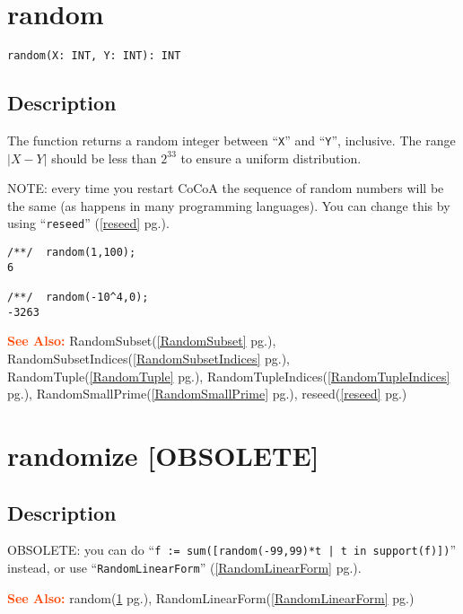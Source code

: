 \documentclass[a4paper]{mybook}
\newenvironment{command}{}{} %
\newcommand\SeeAlso{\par\textcolor{OrangeRed}{\textbf{\large See Also: }}}
\begin{document}
\section{random}
\label{random}
\begin{command} %


\begin{Verbatim}[label=syntax, rulecolor=\color{MidnightBlue},
frame=single]
random(X: INT, Y: INT): INT
\end{Verbatim}


\subsection*{Description}

The function returns a random integer between ``\verb&X&'' and ``\verb&Y&'', inclusive.  The range
$|X-Y|$ should be less than $2^33$ to ensure a uniform distribution.
\par 
NOTE: every time you restart CoCoA the sequence of random numbers will
be the same (as happens in many programming languages).  You can change
this by using ``\verb&reseed&'' (\ref{reseed} pg.\pageref{reseed}).
\begin{Verbatim}[label=example, rulecolor=\color{PineGreen}, frame=single]
/**/  random(1,100);
6

/**/  random(-10^4,0);
-3263
\end{Verbatim}


\SeeAlso %
  RandomSubset(\ref{RandomSubset} pg.\pageref{RandomSubset}), 
    RandomSubsetIndices(\ref{RandomSubsetIndices} pg.\pageref{RandomSubsetIndices}), 
    RandomTuple(\ref{RandomTuple} pg.\pageref{RandomTuple}), 
    RandomTupleIndices(\ref{RandomTupleIndices} pg.\pageref{RandomTupleIndices}), 
    RandomSmallPrime(\ref{RandomSmallPrime} pg.\pageref{RandomSmallPrime}), 
    reseed(\ref{reseed} pg.\pageref{reseed})
\end{command} %

\section{randomize [OBSOLETE]}
\label{randomize [OBSOLETE]}
\begin{command} %



\subsection*{Description}

OBSOLETE:
you can do ``\verb&f := sum([random(-99,99)*t | t in support(f)])&'' instead,
or use ``\verb&RandomLinearForm&'' (\ref{RandomLinearForm} pg.\pageref{RandomLinearForm}).

\SeeAlso %
  random(\ref{random} pg.\pageref{random}), 
    RandomLinearForm(\ref{RandomLinearForm} pg.\pageref{RandomLinearForm})
\end{command} %
\end{document}
